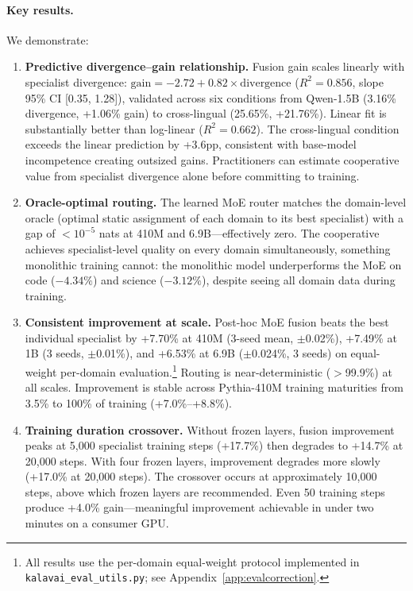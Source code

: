 \documentclass{article}
\begin{document}
\paragraph{Key results.} We demonstrate:
\begin{enumerate}[leftmargin=*, itemsep=2pt]
  \item \textbf{Predictive divergence--gain relationship.} Fusion gain scales linearly with specialist divergence: $\text{gain} = -2.72 + 0.82 \times \text{divergence}$ ($R^2 = 0.856$, slope 95\% CI [0.35, 1.28]), validated across six conditions from Qwen-1.5B (3.16\% divergence, +1.06\% gain) to cross-lingual (25.65\%, +21.76\%). Linear fit is substantially better than log-linear ($R^2 = 0.662$). The cross-lingual condition exceeds the linear prediction by +3.6pp, consistent with base-model incompetence creating outsized gains. Practitioners can estimate cooperative value from specialist divergence alone before committing to training.
  \item \textbf{Oracle-optimal routing.} The learned MoE router matches the domain-level oracle (optimal static assignment of each domain to its best specialist) with a gap of $<10^{-5}$ nats at 410M and 6.9B---effectively zero. The cooperative achieves specialist-level quality on every domain simultaneously, something monolithic training cannot: the monolithic model underperforms the MoE on code ($-4.34\%$) and science ($-3.12\%$), despite seeing all domain data during training.
  \item \textbf{Consistent improvement at scale.} Post-hoc MoE fusion beats the best individual specialist by +7.70\% at 410M (3-seed mean, $\pm$0.02\%), +7.49\% at 1B (3 seeds, $\pm$0.01\%), and +6.53\% at 6.9B ($\pm$0.024\%, 3 seeds) on equal-weight per-domain evaluation.\footnote{All results use the per-domain equal-weight protocol implemented in \texttt{kalavai\_eval\_utils.py}; see Appendix~\ref{app:evalcorrection}.} Routing is near-deterministic ($>$99.9\%) at all scales. Improvement is stable across Pythia-410M training maturities from 3.5\% to 100\% of training (+7.0\%--+8.8\%).
  \item \textbf{Training duration crossover.} Without frozen layers, fusion improvement peaks at 5,000 specialist training steps (+17.7\%) then degrades to +14.7\% at 20,000 steps. With four frozen layers, improvement degrades more slowly (+17.0\% at 20,000 steps). The crossover occurs at approximately 10,000 steps, above which frozen layers are recommended. Even 50 training steps produce +4.0\% gain---meaningful improvement achievable in under two minutes on a consumer GPU.

\end{enumerate}
\end{document}
